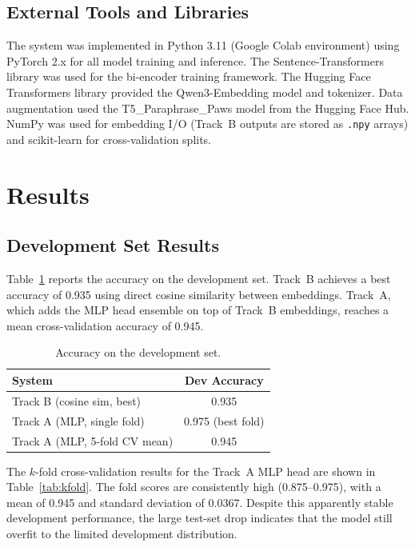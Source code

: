 \documentclass[11pt]{article}
\begin{document}
\subsection{External Tools and Libraries}

The system was implemented in Python 3.11 (Google Colab environment) using PyTorch 2.x for all model training and inference. The Sentence-Transformers library \cite{reimers-gurevych-2019} was used for the bi-encoder training framework. The Hugging Face Transformers library provided the Qwen3-Embedding model and tokenizer. Data augmentation used the T5\_Paraphrase\_Paws model from the Hugging Face Hub. NumPy was used for embedding I/O (Track~B outputs are stored as \texttt{.npy} arrays) and scikit-learn for cross-validation splits.


\section{Results}
\label{sec:results}

\subsection{Development Set Results}

Table~\ref{tab:dev_results} reports the accuracy on the development set. Track~B achieves a best accuracy of 0.935 using direct cosine similarity between embeddings. Track~A, which adds the MLP head ensemble on top of Track~B embeddings, reaches a mean cross-validation accuracy of 0.945.

\begin{table}[ht]
  \centering
  \begin{tabular}{lc}
    \hline
    \textbf{System} & \textbf{Dev Accuracy} \\
    \hline
    Track B (cosine sim, best)     & 0.935   \\
    Track A (MLP, single fold)     & 0.975 (best fold)   \\
    Track A (MLP, 5-fold CV mean)  & 0.945   \\
    \hline
  \end{tabular}
  \caption{Accuracy on the development set.}
  \label{tab:dev_results}
\end{table}

The $k$-fold cross-validation results for the Track~A MLP head are shown in Table~\ref{tab:kfold}. The fold scores are consistently high (0.875--0.975), with a mean of 0.945 and standard deviation of 0.0367. Despite this apparently stable development performance, the large test-set drop indicates that the model still overfit to the limited development distribution.
\end{document}
